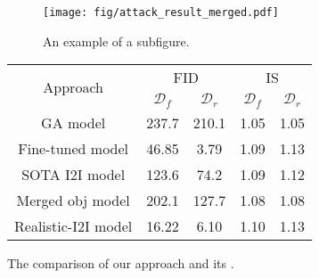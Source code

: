 \begin{figure*}
  \centering
  \begin{subfigure}{0.55\linewidth}
    \texttt{[image: fig/attack\_result\_merged.pdf]}
    \caption{An example of a subfigure.}
    \label{fig:attack_CIFAR10}
  \end{subfigure}
  \hfill
  \begin{minipage}{0.40\linewidth}
    \centering
    \vspace{-16em}
    \begin{tabular}{ccccc}
      \toprule
      \multirow{2}{*}{Approach} & \multicolumn{2}{c}{FID} & \multicolumn{2}{c}{IS} \\ \cline{2-5}
      & $\mathcal{D}_f$ & $\mathcal{D}_r$ & $\mathcal{D}_f$ & $\mathcal{D}_r$ \\
      \hline
      GA model & 237.7 & 210.1 & 1.05 & 1.05 \\
      Fine-tuned model & 46.85 & 3.79 & 1.09 & 1.13 \\
      SOTA I2I model & 123.6 & 74.2 & 1.09 & 1.12 \\
      Merged obj model & 202.1 & 127.7 & 1.08 & 1.08 \\
      Realistic-I2I model & 16.22 & 6.10 & 1.10 & 1.13 \\
      \bottomrule
    \end{tabular}
    \vspace{-1em}
    \label{tab:example}
  \end{minipage}
  \caption{The comparison of our approach and its .}
  \label{fig:short}
\end{figure*}

